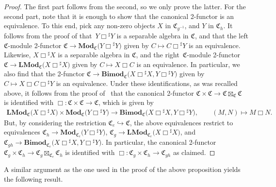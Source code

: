 \documentclass[11pt]{article}
\numberwithin{equation}{section}
\numberwithin{equation}{section}
\begin{document}
\begin{proof}
The first part follows from the second, so we only prove the latter. For the second part, note that it is enough to show that the canonical 2-functor is an equivalence. To this end, pick any non-zero objects $X$ in $\mathfrak{C}_{g^{-1}}$, and $Y$ in $\mathfrak{C}_{h}$. It follows from the proof of \cite[Theorem~5.4.3]{D8} that~$Y\Box {^{\sharp}Y}$ is a separable algebra in $\mathfrak{C}$, and that the left $\mathfrak{C}$-module 2-functor $\mathfrak{C}\rightarrow \mathbf{Mod}_{\mathfrak{C}}\big(Y\Box {^{\sharp}Y}\big)$ given by $C\mapsto C\Box {^{\sharp}Y}$ is an equivalence. Likewise, $X\Box {^{\sharp}X}$ is a separable algebra in $\mathfrak{C}$, and the right~$\mathfrak{C}$-module 2-functor $\mathfrak{C}\rightarrow \mathbf{LMod}_{\mathfrak{C}}\big(X\Box {^{\sharp}X}\big)$ given by $C\mapsto X\Box C$ is an equivalence. In particular, we also find that the 2-functor $\mathfrak{C}\rightarrow \mathbf{Bimod}_{\mathfrak{C}}\big(X\Box {^{\sharp}X},Y\Box {^{\sharp}Y}\big)$ given by $C\mapsto X\Box C\Box {^{\sharp}Y}$ is an equivalence. Under these identifications, as was recalled above, it follows from the proof of~\cite[Theorem~2.2.4]{D10} that the canonical 2-functor $\mathfrak{C}\times\mathfrak{C}\rightarrow\mathfrak{C}\boxtimes_{\mathfrak{C}}\mathfrak{C}$ is identified with $\Box\colon\mathfrak{C}\times\mathfrak{C}\rightarrow \mathfrak{C}$, which is given by
\begin{gather*}
 \mathbf{LMod}_{\mathfrak{C}}\big(X\Box {^{\sharp}X}\big)\times\mathbf{Mod}_{\mathfrak{C}}\big(Y\Box {^{\sharp}Y}\big) \rightarrow \mathbf{Bimod}_{\mathfrak{C}}\big(X\Box {^{\sharp}X},Y\Box {^{\sharp}Y}\big),\qquad
(M,N) \mapsto M\Box N.
\end{gather*}
 But, by considering the restriction $\mathfrak{C}_e\hookrightarrow\mathfrak{C}$, the above equivalences restrict to equivalences $\mathfrak{C}_h\rightarrow \mathbf{Mod}_{\mathfrak{C}_e}\big(Y\Box {^{\sharp}Y}\big)$, $\mathfrak{C}_g\rightarrow \mathbf{LMod}_{\mathfrak{C}_e}\big(X\Box {^{\sharp}X}\big)$, and $\mathfrak{C}_{gh}\rightarrow \mathbf{Bimod}_{\mathfrak{C}_e}\big(X\Box {^{\sharp}X},Y\Box {^{\sharp}Y}\big)$. In particular, the canonical 2-functor $\mathfrak{C}_g\times\mathfrak{C}_h\rightarrow\mathfrak{C}_g\boxtimes_{\mathfrak{C}_e}\mathfrak{C}_h$ is identified with $\Box:\mathfrak{C}_g\times\mathfrak{C}_h\rightarrow\mathfrak{C}_{gh}$ as claimed.
\end{proof}

A similar argument as the one used in the proof of the above proposition yields the following result.
\end{document}
